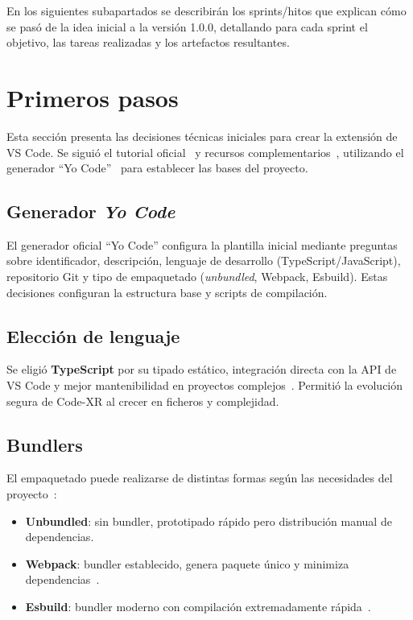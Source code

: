\documentclass[a4paper, 12pt]{book}
\begin{document}
\noindent En los siguientes subapartados se describirán los sprints/hitos que explican cómo se pasó de la idea inicial a la versión 1.0.0, detallando para cada sprint el objetivo, las tareas realizadas y los artefactos resultantes.


\section{Primeros pasos}
\label{sec:primeros-pasos}

Esta sección presenta las decisiones técnicas iniciales para crear la extensión de VS Code. Se siguió el tutorial oficial~\cite{tutorialVSCode} y recursos complementarios~\cite{vscode-youtube}, utilizando el generador ``Yo Code''~\cite{yo-code} para establecer las bases del proyecto.

\subsection{Generador \emph{Yo Code}}
El generador oficial ``Yo Code'' configura la plantilla inicial mediante preguntas sobre identificador, descripción, lenguaje de desarrollo (TypeScript/JavaScript), repositorio Git y tipo de empaquetado (\emph{unbundled}, Webpack, Esbuild). Estas decisiones configuran la estructura base y scripts de compilación.

\subsection{Elección de lenguaje}
Se eligió \textbf{TypeScript} por su tipado estático, integración directa con la API de VS Code y mejor mantenibilidad en proyectos complejos~\cite{typescript}. Permitió la evolución segura de Code-XR al crecer en ficheros y complejidad.

\subsection{Bundlers}
El empaquetado puede realizarse de distintas formas según las necesidades del proyecto~\cite{vscode-bundling}:
\begin{itemize}
  \item \textbf{Unbundled}: sin bundler, prototipado rápido pero distribución manual de dependencias.
  \item \textbf{Webpack}: bundler establecido, genera paquete único y minimiza dependencias~\cite{webpack}.
  \item \textbf{Esbuild}: bundler moderno con compilación extremadamente rápida~\cite{esbuild}.
\end{itemize}
\end{document}
